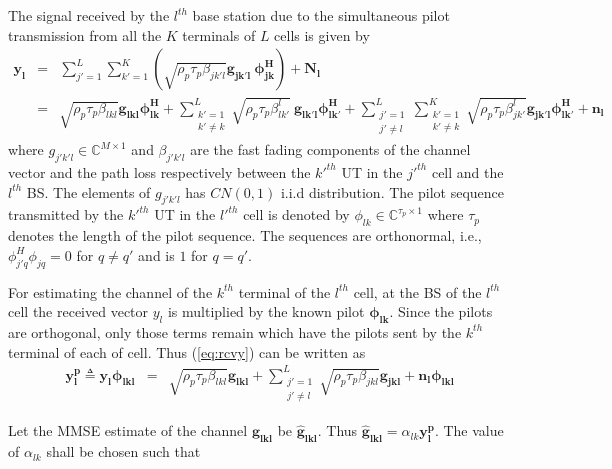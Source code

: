 \documentclass[10pt, a4paper, twoside,fleqn]{article}
\begin{document}
The signal received by the $l^{th}$ base station due to the simultaneous pilot transmission from  all the $K$ terminals of $L$ cells is given by
\begin{eqnarray}\label{eq:rcvy}
	\mathbf{y_{l}} &=& \sum_{j'=1}^{L} \sum_{k'=1}^{K} (\sqrt{\rho_p \tau_p \beta_{jk'l}} \mathbf{g_{jk'l}} \ \mathbf{\phi^H_{jk}})
        		    +  \mathbf{N_{l}} \nonumber \\                    
    			   &=& \sqrt{\rho_p \tau_p \beta_{lkl}} \mathbf{g_{lkl}} \mathbf{\phi^H_{lk}}
        			+  \sum_{\substack{k'=1 \\ k' \neq k}}^{L} \sqrt{\rho_p \tau_p \beta_{lk'}^{l}} \ \mathbf{g_{lk'l}} \mathbf{\phi^H_{lk'}}
        		    +  \sum_{\substack{j'=1 \\ j' \neq l}}^{L} \sum_{\substack{k'=1 \\ k' \neq k}}^{K} \sqrt{\rho_p \tau_p \beta_{jk'}^{l}} 
                       \mathbf{g_{jk'l}} \mathbf{\phi^H_{lk'}}
    			    +  \mathbf{n_{l}}
\end{eqnarray}
where $g_{j'k'l} \in {\mathbb C}^{M \times 1}$  and $\beta_{j'k'l}$ are the fast fading components of the channel vector and the path loss respectively between the $k'^{th}$ UT in the $j'^{th}$ cell and the $l^{th}$ BS. The elements of $g_{j'k'l}$ has $CN(0,1)$ i.i.d distribution. The pilot sequence transmitted by the $k'^{th}$ UT in the $l'^{th}$ cell is denoted by $\phi_{lk} \in {\mathbb C}^{\tau_p \times 1}$ where $\tau_p$ denotes the length of the pilot sequence. The sequences are orthonormal, i.e., $\phi_{j'q}^H \phi_{jq} = 0$ for  $q \ne q'$ and is $1$ for $q=q'$.

For estimating the channel of the $k^{th}$ terminal of the $l^{th}$ cell, at the BS of the $l^{th}$ cell the received vector $y_{l}$ is multiplied by the known pilot $\mathbf{\phi_{lk}}$. Since the pilots are orthogonal, only those terms remain which have the pilots sent by the $k^{th}$ terminal of each of cell. Thus (\ref{eq:rcvy}) can be written as
\begin{eqnarray}
	\mathbf{y_{l}^{p}} \triangleq \mathbf{y_{l}} \mathbf{\phi_{lkl}}
                          &=&     \sqrt{\rho_p\tau_p\beta_{lkl}}\mathbf{g_{lkl}}
                           +      \sum_{\substack{j'=1 \\ j' \neq l}}^{L} \sqrt{\rho_p\tau_p\beta_{jkl}}\mathbf{g_{jkl}}
             			   +      \mathbf{n_{l}}\mathbf{\phi_{lkl}}
\end{eqnarray}

Let the MMSE estimate of the channel $\mathbf{g_{lkl}}$ be $\mathbf{\hat g_{lkl}}$. Thus $\mathbf{\hat g_{lkl}} = \alpha_{lk}\mathbf{y_{l}^{p}}$. The value of $\alpha_{lk}$ shall be chosen such that
        
\end{document}
